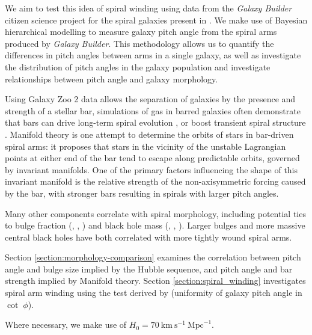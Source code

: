 We aim to test this idea of spiral winding using data from the \textit{Galaxy Builder} citizen science project for the spiral galaxies present in \citet{2020arXiv200610450L}. We make use of Bayesian hierarchical modelling to measure galaxy pitch angle from the spiral arms produced by \textit{Galaxy Builder}. This methodology allows us to quantify the differences in pitch angles between arms in a single galaxy, as well as investigate the distribution of pitch angles in the galaxy population and investigate relationships between pitch angle and galaxy morphology.

Using Galaxy Zoo 2 data \citep{Willett2013:1308.3496v2} allows the separation of galaxies by the presence and strength of a stellar bar, simulations of gas in barred galaxies often demonstrate that bars can drive long-term spiral evolution \citep{2008A&A...489..115R}, or boost transient spiral structure \citep{2012MNRAS.426..167G}. Manifold theory \citealt{2006A&A...453...39R,2009MNRAS.394...67A,2009MNRAS.400.1706A} is one attempt to determine the orbits of stars in bar-driven spiral arms: it proposes that stars in the vicinity of the unstable Lagrangian points at either end of the bar tend to escape along predictable orbits, governed by invariant manifolds. One of the primary factors influencing the shape of this invariant manifold is the relative strength of the non-axisymmetric forcing caused by the bar, with stronger bars resulting in spirals with larger pitch angles.

Many other components correlate with spiral morphology, including potential ties to bulge fraction (\citealt{1975A&A....44..363Y}, \citealt{2013MNRAS.436.1074S}, \citealt{2019MNRAS.487.1808M}) and black hole mass (\citealt{2008ApJ...678L..93S}, \citealt{2017MNRAS.471.2187D}, \citealt{2019MS&E..571a2118A}). Larger bulges and more massive central black holes have both correlated with more tightly wound spiral arms.

Section \ref{section:morphology-comparison} examines the correlation between pitch angle and bulge size implied by the Hubble sequence, and pitch angle and bar strength implied by Manifold theory. Section \ref{section:spiral_winding} investigates spiral arm winding using the test derived by \cite{2019arXiv190910291P} (uniformity of galaxy pitch angle in $\cot\;\phi$).

Where necessary, we make use of $H_0 = 70\ \text{km}\ \text{s}^{-1}\ \text{Mpc}^{-1}$.
